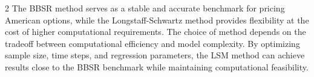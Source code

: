 \begin{multicols}{2}
The BBSR method serves as a stable and accurate benchmark for pricing American options, while the Longstaff-Schwartz method provides flexibility at the cost of higher computational requirements. The choice of method depends on the tradeoff between computational efficiency and model complexity. By optimizing sample size, time steps, and regression parameters, the LSM method can achieve results close to the BBSR benchmark while maintaining computational feasibility.
\end{multicols}